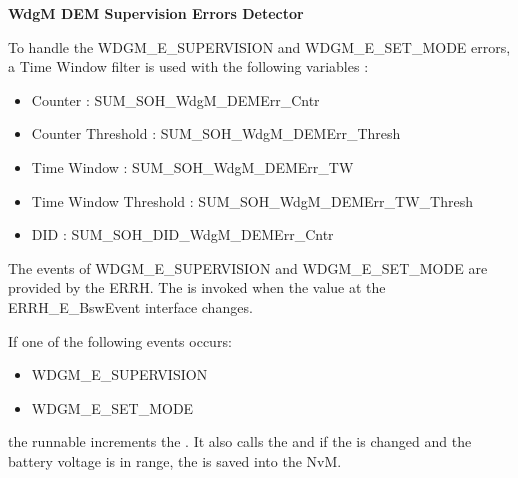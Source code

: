 {
    \textbf{WdgM DEM Supervision Errors Detector}
    
    
    To handle the WDGM\_E\_SUPERVISION and WDGM\_E\_SET\_MODE errors, a Time Window filter is used  with the following variables :
    
    
    \begin{itemize}
        \item Counter               : SUM_SOH_WdgM_DEMErr_Cntr
        \item Counter Threshold     : SUM_SOH_WdgM_DEMErr_Thresh
        \item Time Window           : SUM_SOH_WdgM_DEMErr_TW
        \item Time Window Threshold : SUM_SOH_WdgM_DEMErr_TW_Thresh
        \item DID                   : SUM_SOH_DID_WdgM_DEMErr_Cntr
    \end{itemize}
    
}
{
       
}

{
The events  of WDGM\_E\_SUPERVISION and WDGM\_E\_SET\_MODE are provided by the ERRH. \newline
The \textbf{} is invoked when the value at the ERRH\_E\_BswEvent interface changes. 

If one of the following events occurs:

\begin{itemize}
\item WDGM\_E\_SUPERVISION
\item WDGM\_E\_SET\_MODE
\end{itemize}


the runnable increments the . It also calls the  and if the  is changed and the battery voltage is in range, the  is saved into the NvM.
}
{
        
}

